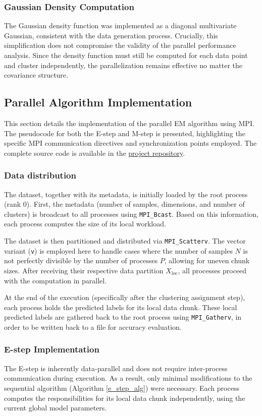 \subsubsection*{Gaussian Density Computation}
The Gaussian density function was implemented as a diagonal multivariate Gaussian, consistent with the data generation process.
Crucially, this simplification does not compromise the validity of the parallel performance analysis.
Since the density function must still be computed for each data point and cluster independently, 
the parallelization remains effective no matter the covariance structure.

\subsection{Parallel Algorithm Implementation}
This section details the implementation of the parallel EM algorithm using MPI.
The pseudocode for both the E-step and M-step is presented, highlighting the specific MPI communication directives and synchronization points employed.
The complete source code is available in the \href{https://github.com/davide-dona/parallel-em-clustering}{project repository}.

\subsubsection*{Data distribution}
The dataset, together with its metadata, is initially loaded by the root process (rank 0).
First, the metadata (number of samples, dimensions, and number of clusters) is broadcast to all processes using \texttt{MPI\_Bcast}.
Based on this information, each process computes the size of its local workload.
 
The dataset is then partitioned and distributed via \texttt{MPI\_Scatterv}.
The vector variant (\texttt{v}) is employed here to handle cases where the number of samples $N$ is not perfectly divisible by the number of processes $P$, allowing for uneven chunk sizes.
After receiving their respective data partition $X_{\text{loc}}$, all processes proceed with the computation in parallel.

At the end of the execution (specifically after the clustering assignment step), each process holds the predicted labels for its local data chunk.
These local predicted labels are gathered back to the root process using \texttt{MPI\_Gatherv}, in order to be written back to a file for accuracy evaluation.

\subsubsection*{E-step Implementation}
The E-step is inherently data-parallel and does not require inter-process communication during execution.
As a result, only minimal modifications to the sequential algorithm (Algorithm \ref{e_step_alg}) were necessary.
Each process computes the responsibilities for its local data chunk independently, using the current global model parameters.

